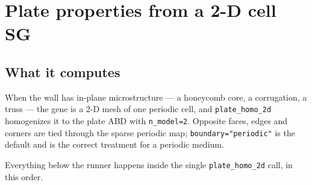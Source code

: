 \section{Plate properties from a 2-D cell SG}
\label{sec:solid-plate2d}

\subsection{What it computes}

When the wall has in-plane microstructure --- a honeycomb core, a corrugation, a
truss --- the gene is a 2-D mesh of one periodic cell, and \texttt{plate\_homo\_2d}
homogenizes it to the plate ABD with \texttt{n\_model=2}. Opposite faces, edges
and corners are tied through the sparse periodic map;
\texttt{boundary="periodic"} is the default and is the correct treatment for a
periodic medium.

Everything below the runner happens inside the single \texttt{plate\_homo\_2d}
call, in this order.

